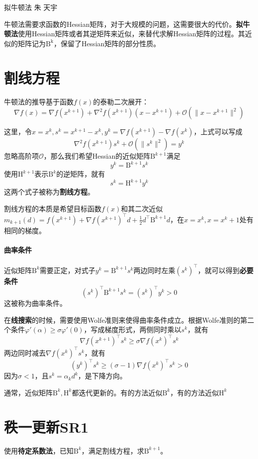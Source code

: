 \documentclass[a4paper]{D:/repositories/MyDGP/latex/PaperReadingLog}
\begin{document}
\PaperInfo
{拟牛顿法}
{朱}
{天宇}
{}

牛顿法需要求函数的Hessian矩阵，对于大规模的问题，这需要很大的代价。\textbf{拟牛顿法}使用Hessian矩阵或者其逆矩阵来近似，来替代求解Hessian矩阵的过程。其近似的矩阵记为$\mathrm{B^k}$，保留了Hessian矩阵的部分性质。

\section{割线方程}
牛顿法的推导基于函数$f(x)$的泰勒二次展开：
$$
\nabla f(x)=\nabla f(x^{k+1})+\nabla^2f(x^{k+1})(x-x^{k+1})+\mathcal{O}(\lVert x-x^{k+1}\lVert^2)
$$

这里，令$x=x^k,s^k=x^{k+1}-x^k,y^k=\nabla f(x^{k+1})-\nabla f(x^k)$，上式可以写成
$$
\nabla^2f(x^{k+1})s^k+\mathcal{O}(\lVert s^k \lVert^2)=y^k
$$
忽略高阶项$\mathcal{O}$，那么我们希望Hessian的近似矩阵$\mathrm{B}^{k+1}$满足
$$
y^k=\mathrm{B}^{k+1}s^k
$$
使用$\mathrm{H}^{k+1}$表示$\mathrm{B}^k$的逆矩阵，就有
$$
s^k=\mathrm{H}^{k+1}y^k
$$
这两个式子被称为\textbf{割线方程}。

割线方程的本质是希望目标函数$f(x)$和其二次近似$m_{k+1}(d)=f(x^{k+1})+\nabla f(x^{k+1})^\top d+\frac{1}{2}d^\top \mathrm{B}^{k+1}d$，在$x=x^k,x=x^k+1$处有相同的梯度。

\paragraph{曲率条件}
近似矩阵$\mathrm{B}^k$需要正定，对式子$y^k=\mathrm{B}^{k+1}s^k$两边同时左乘$(s^k)^\top$，就可以得到\textbf{必要条件}
$$
(s^k)^\top \mathrm{B}^{k+1}s^k=(s^k)^\top y^k>0
$$
这被称为曲率条件。

在\textbf{线搜索}的时候，需要使用Wolfe准则来使得曲率条件成立。根据Wolfe准则的第二个条件$\varphi'(\alpha)\ge \sigma\varphi'(0)$，写成梯度形式，两侧同时乘以$s^k$，就有
$$
\nabla f(x^{k+1})^\top s^k\ge \sigma\nabla f(x^k)^\top s^k
$$
两边同时减去$\nabla f(x^k)^\top s^k$，就有
$$
(y^k)^\top s^k\ge (\sigma-1)\nabla f(x^k)^\top s^k>0
$$
因为$\sigma<1$，且$s^k=\alpha_kd^k$，是下降方向。

通常，近似矩阵$\mathrm{B}^k,\mathrm{H}^k$都迭代更新的。有的方法近似$\mathrm{B}^k$，有的方法近似$\mathrm{H}^k$

\section{秩一更新SR1}
使用\textbf{待定系数法}，已知$\mathrm{B}^k$，满足割线方程，求$\mathrm{B}^{k+1}$。
\end{document}
